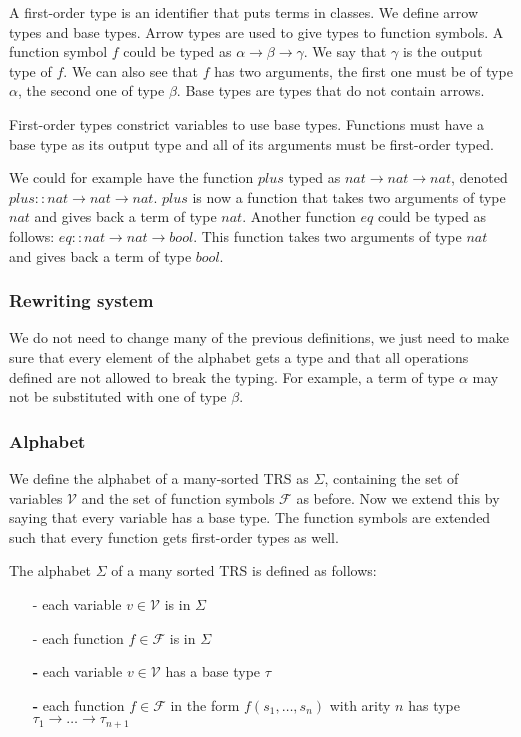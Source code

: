 A first-order type is an identifier that puts terms in classes. We define arrow types and base types. Arrow types are used to give types to function symbols. A function symbol $f$ could be typed as $\alpha \rightarrow \beta \rightarrow \gamma$. We say that $\gamma$ is the output type of $f$. We can also see that $f$ has two arguments, the first one must be of type $\alpha$, the second one of type $\beta$. Base types are types that do not contain arrows.

First-order types constrict variables to use base types. Functions must have a base type as its output type and all of its arguments must be first-order typed.

We could for example have the function $plus$ typed as $nat \rightarrow nat \rightarrow nat$, denoted $plus :: nat \rightarrow nat \rightarrow nat$. $plus$ is now a function that takes two arguments of type $nat$ and gives back a term of type $nat$. Another function $eq$ could be typed as follows: $eq :: nat \rightarrow nat \rightarrow bool$. This function takes two arguments of type $nat$ and gives back a term of type $bool$. 

\subsubsection{Rewriting system}
We do not need to change many of the previous definitions, we just need to make sure that every element of the alphabet gets a type and that all operations defined are not allowed to break the typing. For example, a term of type $\alpha$ may not be substituted with one of type $\beta$.
\subsubsection{Alphabet}
We define the alphabet of a many-sorted TRS as $\Sigma$, containing the set of variables $\mathcal{V}$ and the set of function symbols $\mathcal{F}$ as before. Now we extend this by saying that every variable has a base type. The function symbols are extended such that every function gets first-order types as well. 
\begin{definition}
The alphabet $\Sigma$ of a many sorted TRS is defined as follows:
\begin{itemize}
    \itemsep -0.4em
    \item[-] each variable $v \in \mathcal{V}$ is in $\Sigma$
    \item[-] each function $f \in \mathcal{F}$ is in $\Sigma$
    \item[\bf-] each variable $v \in \mathcal{V}$ has a base type $\tau$
    \item[\bf-] each function $f \in \mathcal{F}$ in the form $f(s_1, \dots, s_n)$ with arity $n$ has type $\tau_1 \rightarrow \dots \rightarrow \tau_{n+1}$
\end{itemize}
\end{definition}


